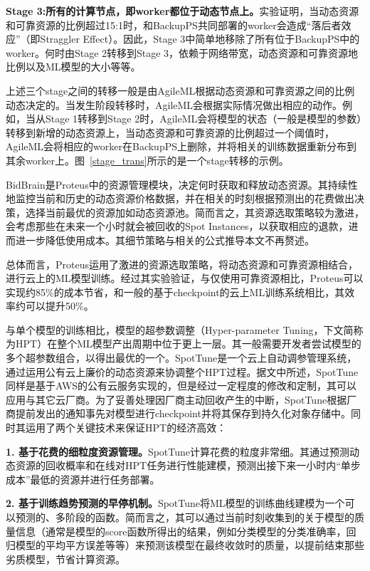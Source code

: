 \textbf{Stage 3:所有的计算节点，即worker都位于动态节点上。}实验证明，当动态资源和可靠资源的比例超过15:1时，和BackupPS共同部署的worker会造成“落后者效应”（即Straggler Effect）。因此，Stage 3中简单地移除了所有位于BackupPS中的worker。何时由Stage 2转移到Stage 3，依赖于网络带宽，动态资源和可靠资源地比例以及ML模型的大小等等。

上述三个stage之间的转移一般是由AgileML根据动态资源和可靠资源之间的比例动态决定的。当发生阶段转移时，AgileML会根据实际情况做出相应的动作。例如，当从Stage 1转移到Stage 2时，AgileML会将模型的状态（一般是模型的参数）转移到新增的动态资源上，当动态资源和可靠资源的比例超过一个阈值时，AgileML会将相应的worker在BackupPS上删除，并将相关的训练数据重新分布到其余worker上。图~\ref{stage_trans}所示的是一个stage转移的示例。

BidBrain是Proteus中的资源管理模块，决定何时获取和释放动态资源。其持续性地监控当前和历史的动态资源价格数据，并在相关的时刻根据预测出的花费做出决策，选择当前最优的资源加如动态资源池。简而言之，其资源选取策略较为激进，会考虑那些在未来一个小时就会被回收的Spot Instances，以获取相应的退款，进而进一步降低使用成本。其细节策略与相关的公式推导本文不再赘述。

总体而言，Proteus运用了激进的资源选取策略，将动态资源和可靠资源相结合，进行云上的ML模型训练。经过其实验验证，与仅使用可靠资源相比，Proteus可以实现约85\%的成本节省，和一般的基于checkpoint的云上ML训练系统相比，其效率约可以提升50\%。

与单个模型的训练相比，模型的超参数调整（Hyper-parameter Tuning，下文简称为HPT）在整个ML模型产出周期中位于更上一层。其一般需要开发者尝试模型的多个超参数组合，以得出最优的一个。SpotTune是一个云上自动调参管理系统，通过运用公有云上廉价的动态资源来协调整个HPT过程。据文中所述，SpotTune同样是基于AWS的公有云服务实现的，但是经过一定程度的修改和定制，其可以应用与其它云厂商。为了妥善处理因厂商主动回收产生的中断，SpotTune根据厂商提前发出的通知事先对模型进行checkpoint并将其保存到持久化对象存储中。同时其运用了两个关键技术来保证HPT的经济高效：

\textbf{1. 基于花费的细粒度资源管理。}SpotTune计算花费的粒度非常细。其通过预测动态资源的回收概率和在线对HPT任务进行性能建模，预测出接下来一小时内“单步成本”最低的资源并进行任务部署。

\textbf{2. 基于训练趋势预测的早停机制。}SpotTune将ML模型的训练曲线建模为一个可以预测的、多阶段的函数。简而言之，其可以通过当前时刻收集到的关于模型的质量信息（通常是模型的score函数所得出的结果，例如分类模型的分类准确率，回归模型的平均平方误差等等）来预测该模型在最终收敛时的质量，以提前结束那些劣质模型，节省计算资源。

